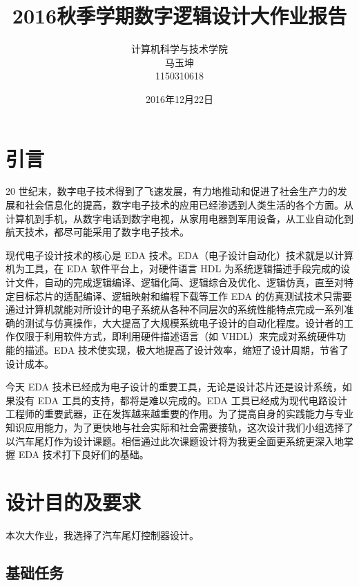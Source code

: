 \documentclass[11pt, a4paper]{article}
\begin{document}
\begin{CJK*}{UTF8}{gbsn}
  \title{\Huge \bf 2016秋季学期数字逻辑设计大作业报告}
  \author{计算机科学与技术学院\\马玉坤\\1150310618}
  \date{2016年12月22日}
  \maketitle
  \newpage
  \renewcommand{\contentsname}{\textbf{目录}}
  \tableofcontents
\newpage
  \section{引言}
  
  20 世纪末，数字电子技术得到了飞速发展，有力地推动和促进了社会生产力的发展和社会信息化的提高，数字电子技术的应用已经渗透到人类生活的各个方面。从计算机到手机，从数字电话到数字电视，从家用电器到军用设备，从工业自动化到航天技术，都尽可能采用了数字电子技术。
  
  现代电子设计技术的核心是 EDA 技术。EDA（电子设计自动化）技术就是以计算机为工具，在 EDA 软件平台上，对硬件语言 HDL 为系统逻辑描述手段完成的设计文件，自动的完成逻辑编译、逻辑化简、逻辑综合及优化、逻辑仿真，直至对特定目标芯片的适配编译、逻辑映射和编程下载等工作 EDA 的仿真测试技术只需要通过计算机就能对所设计的电子系统从各种不同层次的系统性能特点完成一系列准确的测试与仿真操作，大大提高了大规模系统电子设计的自动化程度。设计者的工作仅限于利用软件方式，即利用硬件描述语言（如 VHDL）来完成对系统硬件功能的描述。EDA 技术使实现，极大地提高了设计效率，缩短了设计周期，节省了设计成本。
  
  今天 EDA 技术已经成为电子设计的重要工具，无论是设计芯片还是设计系统，如果没有 EDA 工具的支持，都将是难以完成的。EDA 工具已经成为现代电路设计工程师的重要武器，正在发挥越来越重要的作用。为了提高自身的实践能力与专业知识应用能力，为了更快地与社会实际和社会需要接轨，这次设计我们小组选择了以汽车尾灯作为设计课题。相信通过此次课题设计将为我更全面更系统更深入地掌握 EDA 技术打下良好们的基础。

  \section{设计目的及要求}

  本次大作业，我选择了汽车尾灯控制器设计。

  \subsection{基础任务}


\end{CJK*}
\end{document}
